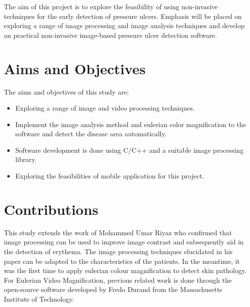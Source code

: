 The aim of this project is to explore the feasibility of using non-invasive techniques for the early detection of pressure ulcers. Emphasis will be placed on exploring a range of image processing and image analysis techniques and develop an practical non-invasive image-based pressure ulcer detection software.

\section{Aims and Objectives}
The aims and objectives of this study are:
\begin{itemize}
    \item Exploring a range of image and video processing techniques.
    \item Implement the image analysis method and eulerian color magnification to the software and detect the disease area automatically.
    \item Software development is done using C/C++ and a suitable image processing library. 
    \item Exploring the feasibilities of mobile application for this project.
\end{itemize}
\section{Contributions}
This study extends the work of Mohammed Umar Riyaz \cite{Mohammed} who confirmed that image processing can be used to improve image contrast and subsequently aid in the detection of erythema. The image processing techniques elucidated in his paper can be
adapted to the characteristics of the patients. In the meantime, it was the first time to apply eulerian colour magnification to detect skin pathology. \\

For Eulerian Video Magnification, previous related work is done through the open-source software developed by Fredo Durand \cite{Fredo} from the Massachusetts Institute of
Technology. 


